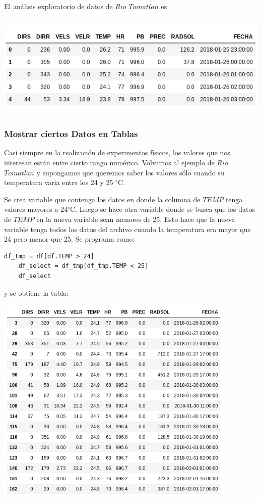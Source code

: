 \documentclass{article}
\begin{document}
    El análisis exploratorio de datos de $Rio$ $Tomatlan$ es
    
\includegraphics[height=5cm]{Analisis_de_datos.png}

\subsubsection{Mostrar ciertos Datos en Tablas}
Casi siempre en la realización de experimentos físicos, los valores que nos interesan están entre cierto rango numérico. Volvamos al ejemplo de $Rio$ $Tomatlan$ y supongamos que queremos saber los valores sólo cuando su temperatura varia entre los 24 y 25 $^\circ$C. 
    
    Se crea variable que contenga los datos en donde la columna de $TEMP$ tenga valores mayores a 24$^\circ$C. Luego se hace otra variable donde se busca que los datos de $TEMP$ en la nueva variable sean menores de 25. Esto hace que la nueva variable tenga todos los datos del archivo cuando la temperatura era mayor que 24 pero menor que 25. Se programa como:
    
    \begin{verbatim}df_tmp = df[df.TEMP > 24] 
	df_select = df_tmp[df_tmp.TEMP < 25]
	df_select
    \end{verbatim}
    y se obtiene la tabla:
    
    \begin{center}
    \includegraphics[height=10cm]{Temp_24_25.png}
    \end{center}
    
\end{document}
